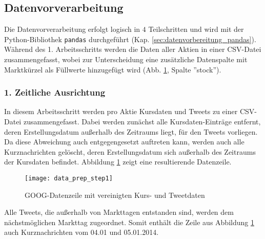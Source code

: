 \subsection{Datenvorverarbeitung}\label{sec:data_prep}

Die Datenvorverarbeitung erfolgt logisch in $4$ Teilschritten und wird mit der Python-Bibliothek \texttt{pandas} durchgeführt (Kap. \ref{sec:datenvorbereitung_pandas}). Während des 1. Arbeitsschritts werden die Daten aller Aktien in einer \ac{CSV}-Datei zusammengefasst, wobei zur Unterscheidung eine zusätzliche Datenspalte mit Marktkürzel als Füllwerte hinzugefügt wird (Abb. \ref{fig:data_prep_step1}, Spalte ''stock'').

\subsubsection*{1. Zeitliche Ausrichtung}

In diesem Arbeitsschritt werden pro Aktie Kursdaten und Tweets zu einer \ac{CSV}-Datei zusammengefasst. Dabei werden zunächst alle Kursdaten-Einträge entfernt, deren Erstellungsdatum außerhalb des Zeitraums liegt, für den Tweets vorliegen. Da diese Abweichung auch entgegengesetzt auftreten kann, werden auch alle Kurznachrichten gelöscht, deren Erstellungsdatum sich außerhalb des Zeitraums der Kursdaten befindet. Abbildung \ref{fig:data_prep_step1} zeigt eine resultierende Datenzeile.
\begin{figure}[H]
	\texttt{[image: data\_prep\_step1]}
	\caption{GOOG-Datenzeile mit vereinigten Kurs- und Tweetdaten}
	\label{fig:data_prep_step1}
\end{figure}
Alle Tweets, die außerhalb von Markttagen entstanden sind, werden dem nächstmöglichen Markttag zugeordnet. Somit enthält die Zeile aus Abbildung \ref{fig:data_prep_step1} auch Kurznachrichten vom 04.01 und 05.01.2014. 


